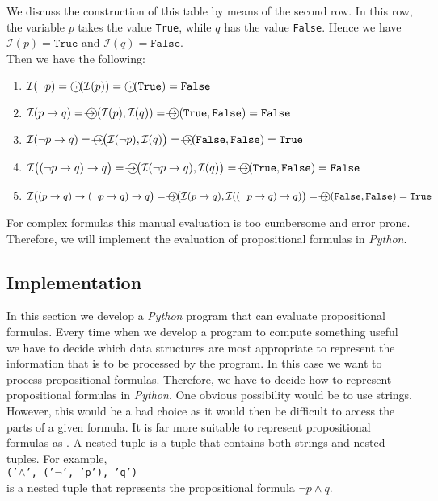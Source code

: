 We discuss the construction of this table by means of the second row.
In this row, the variable $p$ takes the value  \texttt{True}, while $q$ has the value \texttt{False}.  Hence we
have
\\[0.2cm]
\hspace*{1.3cm} $\mathcal{I}(p) = \texttt{True}$ and $\mathcal{I}(q) = \texttt{False}$. \\[0.2cm]
Then we have the following:
\begin{enumerate}
\item $\mathcal{I}(\neg p) = \circneg\,(\mathcal{I}(p)) = \circneg\,( \texttt{True}) = \texttt{False}$
\item $\mathcal{I}(p \rightarrow q) = \circright\,(\mathcal{I}(p), \mathcal{I}(q)) = \circright\,(\texttt{True}, \texttt{False}) = \texttt{False}$
\item $\mathcal{I}(\neg p \rightarrow q) = \circright\bigl( \mathcal{I}(\neg p), \mathcal{I}(q)\bigr) = \circright(\texttt{False}, \texttt{False}) = \texttt{True}$
\item $\mathcal{I}\bigl((\neg p \rightarrow q) \rightarrow q\bigr) = 
          \circright\bigl( \mathcal{I}(\neg p \rightarrow q), \mathcal{I}(q) \bigr) = 
          \circright( \texttt{True}, \texttt{False} ) = \texttt{False}$
\item $\mathcal{I}\bigl((p \rightarrow q) \rightarrow  (\neg p \rightarrow q) \rightarrow q\bigr) = 
      \circright\bigl( \mathcal{I}(p \rightarrow q),  \mathcal{I}((\neg p \rightarrow q) \rightarrow q)\bigr) = 
       \circright\,( \texttt{False},  \texttt{False} ) = \texttt{True}$
\end{enumerate}
For complex formulas this manual evaluation is too cumbersome and error prone.
Therefore, we will implement the evaluation of propositional formulas in \textsl{Python}.

\subsection{Implementation} 
In this section we develop a \textsl{Python} program that can evaluate propositional formulas.
Every time when we develop a program to compute something useful we have to decide which data structures are
most appropriate to represent the information that is to be processed by the program.  In this case we want to
process propositional formulas.  Therefore, we have to decide how to represent propositional formulas in
\textsl{Python}.  One obvious possibility would be to use strings.  However, this would be a bad choice as it
would then be difficult to access the parts of a given formula.  It is far more suitable to represent
propositional formulas as .  A nested tuple is a tuple that contains both strings and
nested tuples.  For example,
\\[0.2cm]
\hspace*{1.3cm}
\texttt{('$\wedge$', ('$\neg$', 'p'), 'q')}
\\[0.2cm]
is a nested tuple that represents the propositional formula $\neg p \wedge q$.

